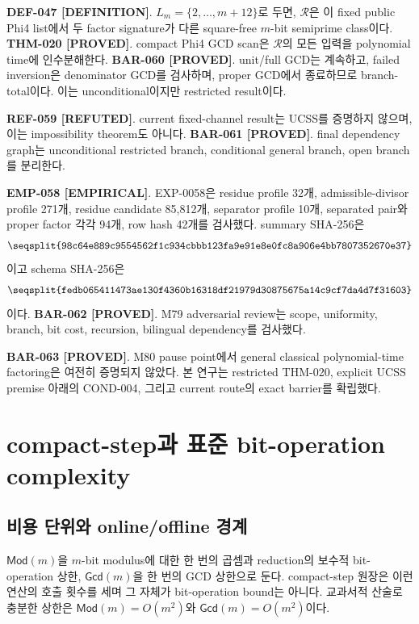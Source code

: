 \documentclass[11pt]{article}
\newcommand{\claimstatus}[2]{\textbf{#1 [#2]}}
\begin{document}
\claimstatus{DEF-047}{DEFINITION}. \(L_m=\{2,\ldots,m+12\}\)로 두면,
\(\mathcal R\)은 이 fixed public Phi4 list에서 두 factor signature가
다른 square-free \(m\)-bit semiprime class이다.
\claimstatus{THM-020}{PROVED}. compact Phi4 GCD scan은
\(\mathcal R\)의 모든 입력을 polynomial time에 인수분해한다.
\claimstatus{BAR-060}{PROVED}. unit/full GCD는 계속하고, failed inversion은
denominator GCD를 검사하며, proper GCD에서 종료하므로 branch-total이다.
이는 unconditional이지만 restricted result이다.

\claimstatus{REF-059}{REFUTED}. current fixed-channel result는 UCSS를
증명하지 않으며, 이는 impossibility theorem도 아니다.
\claimstatus{BAR-061}{PROVED}. final dependency graph는 unconditional
restricted branch, conditional general branch, open branch를 분리한다.

\claimstatus{EMP-058}{EMPIRICAL}. EXP-0058은 residue profile 32개,
admissible-divisor profile 271개, residue candidate 85,812개, separator
profile 10개, separated pair와 proper factor 각각 94개, row hash 42개를
검사했다. summary SHA-256은
\[
\texttt{\seqsplit{98c64e889c9554562f1c934cbbb123fa9e91e8e0fc8a906e4bb7807352670e37}}
\]
이고 schema SHA-256은
\[
\texttt{\seqsplit{fedb065411473ae130f4360b16318df21979d30875675a14c9cf7da4d7f31603}}
\]
이다.
\claimstatus{BAR-062}{PROVED}. M79 adversarial review는 scope, uniformity,
branch, bit cost, recursion, bilingual dependency를 검사했다.

\claimstatus{BAR-063}{PROVED}. M80 pause point에서 general classical
polynomial-time factoring은 여전히 증명되지 않았다. 본 연구는
restricted THM-020, explicit UCSS premise 아래의 COND-004, 그리고
current route의 exact barrier를 확립했다.

\section{compact-step과 표준 bit-operation complexity}

\subsection{비용 단위와 online/offline 경계}

\(\mathsf{Mod}(m)\)을 \(m\)-bit modulus에 대한 한 번의 곱셈과 reduction의
보수적 bit-operation 상한, \(\mathsf{Gcd}(m)\)을 한 번의 GCD 상한으로
둔다. compact-step 원장은 이런 연산의 호출 횟수를 세며 그 자체가
bit-operation bound는 아니다. 교과서적 산술로 충분한 상한은
\(\mathsf{Mod}(m)=O(m^2)\)와 \(\mathsf{Gcd}(m)=O(m^2)\)이다.
\end{document}

